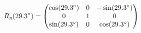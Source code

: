 \documentclass[preview]{standalone}
\begin{document}
\begin{align*}
\special{dvisvgm:raw <g id='unique000'>}R_y(29.3^\circ) = \begin{pmatrix} \cos(29.3^\circ) & 0 & -\sin(29.3^\circ) \\ 0 & 1 & 0 \\ \sin(29.3^\circ) & 0 & \cos(29.3^\circ) \end{pmatrix}\special{dvisvgm:raw </g>}
\end{align*}
\end{document}
